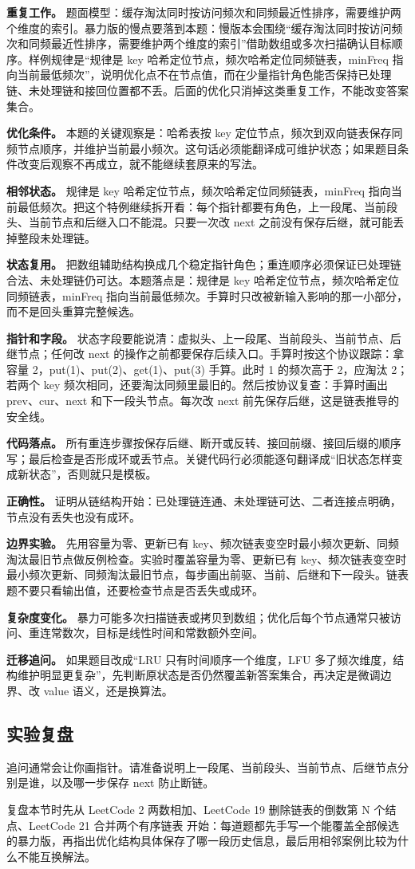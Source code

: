 \textbf{重复工作。} 题面模型：缓存淘汰同时按访问频次和同频最近性排序，需要维护两个维度的索引。暴力版的慢点要落到本题：慢版本会围绕“缓存淘汰同时按访问频次和同频最近性排序，需要维护两个维度的索引”借助数组或多次扫描确认目标顺序。样例规律是“规律是 key 哈希定位节点，频次哈希定位同频链表，minFreq 指向当前最低频次”，说明优化点不在节点值，而在少量指针角色能否保持已处理链、未处理链和接回位置都不丢。后面的优化只消掉这类重复工作，不能改变答案集合。

\textbf{优化条件。} 本题的关键观察是：哈希表按 key 定位节点，频次到双向链表保存同频节点顺序，并维护当前最小频次。这句话必须能翻译成可维护状态；如果题目条件改变后观察不再成立，就不能继续套原来的写法。

\textbf{相邻状态。} 规律是 key 哈希定位节点，频次哈希定位同频链表，minFreq 指向当前最低频次。把这个特例继续拆开看：每个指针都要有角色，上一段尾、当前段头、当前节点和后继入口不能混。只要一次改 next 之前没有保存后继，就可能丢掉整段未处理链。

\textbf{状态复用。} 把数组辅助结构换成几个稳定指针角色；重连顺序必须保证已处理链合法、未处理链仍可达。本题落点是：规律是 key 哈希定位节点，频次哈希定位同频链表，minFreq 指向当前最低频次。手算时只改被新输入影响的那一小部分，而不是回头重算完整候选。

\textbf{指针和字段。} 状态字段要能说清：虚拟头、上一段尾、当前段头、当前节点、后继节点；任何改 next 的操作之前都要保存后续入口。手算时按这个协议跟踪：拿容量 2，put(1)、put(2)、get(1)、put(3) 手算。此时 1 的频次高于 2，应淘汰 2；若两个 key 频次相同，还要淘汰同频里最旧的。然后按协议复查：手算时画出 prev、cur、next 和下一段头节点。每次改 next 前先保存后继，这是链表推导的安全线。

\textbf{代码落点。} 所有重连步骤按保存后继、断开或反转、接回前缀、接回后缀的顺序写；最后检查是否形成环或丢节点。关键代码行必须能逐句翻译成“旧状态怎样变成新状态”，否则就只是模板。

\textbf{正确性。} 证明从链结构开始：已处理链连通、未处理链可达、二者连接点明确，节点没有丢失也没有成环。

\textbf{边界实验。} 先用容量为零、更新已有 key、频次链表变空时最小频次更新、同频淘汰最旧节点做反例检查。实验时覆盖容量为零、更新已有 key、频次链表变空时最小频次更新、同频淘汰最旧节点，每步画出前驱、当前、后继和下一段头。链表题不要只看输出值，还要检查节点是否丢失或成环。

\textbf{复杂度变化。} 暴力可能多次扫描链表或拷贝到数组；优化后每个节点通常只被访问、重连常数次，目标是线性时间和常数额外空间。

\textbf{迁移追问。} 如果题目改成“LRU 只有时间顺序一个维度，LFU 多了频次维度，结构维护明显更复杂”，先判断原状态是否仍然覆盖新答案集合，再决定是微调边界、改 value 语义，还是换算法。

\subsection{实验复盘}

追问通常会让你画指针。请准备说明上一段尾、当前段头、当前节点、后继节点分别是谁，以及哪一步保存 next 防止断链。

复盘本节时先从 LeetCode 2 两数相加、LeetCode 19 删除链表的倒数第 N 个结点、LeetCode 21 合并两个有序链表 开始：每道题都先手写一个能覆盖全部候选的暴力版，再指出优化结构具体保存了哪一段历史信息，最后用相邻案例比较为什么不能互换解法。
